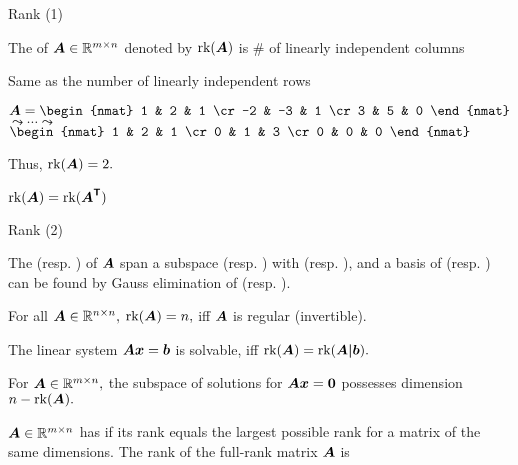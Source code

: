 \documentclass[handout,fleqn,aspectratio=169]{beamer}
\begin{document}
\begin{frame}{Rank (1)}

\plitemsep 0.15in

\bci 
\item {} The   of $\bm{A} \in {\mathbb R}^{m \times n}$ denoted by $\text{rk}(\bm{A})$ is \# of linearly independent columns 
\bci
\item Same as the number of linearly independent rows
\eci

\item $\mat{A} = 
\begin{nmat}
1 & 2 & 1 \cr
-2 & -3 & 1 \cr
3 & 5 & 0 
\end{nmat}$
$\leadsto \cdots \leadsto$
$\begin{nmat}
1 & 2 & 1 \cr
0 & 1 & 3 \cr
0 & 0 & 0 
\end{nmat}$

\bigskip
Thus, $\text{rk}(\bm{A})=2.$

\item $\text{rk}(\bm{A}) = \text{rk}(\bm{{\bm{A}}^{\mathsf{T}}})$
\eci

\end{frame}

\begin{frame}{Rank (2)}

\plitemsep 0.2in

\bci 

\item The  (resp. ) of $\bm{A}$ span a subspace  (resp. ) with   (resp. ), and 
a basis of  (resp. ) can be found by Gauss elimination of  (resp. ).

\item For all $\bm{A} \in {\mathbb R}^{n \times n},$ $\text{rk}(\bm{A}) =n,$ iff $\bm{A}$ is regular (invertible). 

\item The linear system $\bm{A} \bm{x} = \bm{b}$ is solvable, iff $\text{rk}(\bm{A}) = \text{rk}(\bm{A|b}).$

\item For $\bm{A} \in {\mathbb R}^{m \times n},$ the subspace of solutions for $\bm{A} \bm{x} = \bm{0}$ possesses dimension $n - \text{rk}(\bm{A}).$

\item $\bm{A} \in {\mathbb R}^{m \times n}$ has  if its rank equals the largest possible rank for a matrix of the same dimensions. The rank of the full-rank matrix $\bm{A}$ is 

\eci

\end{frame}
\end{document}
